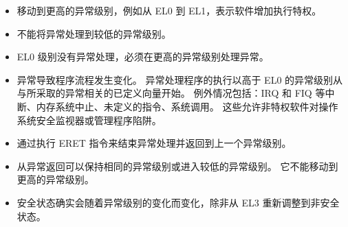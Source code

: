 \begin{itemize}
  \item 移动到更高的异常级别，例如从 EL0 到 EL1，表示软件增加执行特权。
  \item 不能将异常处理到较低的异常级别。
  \item EL0 级别没有异常处理，必须在更高的异常级别处理异常。
  \item 异常导致程序流程发生变化。
    异常处理程序的执行以高于 EL0 的异常级别从与所采取的异常相关的已定义向量开始。
    例外情况包括：IRQ 和 FIQ 等中断、内存系统中止、未定义的指令、系统调用。
    这些允许非特权软件对操作系统安全监视器或管理程序陷阱。
  \item 通过执行 ERET 指令来结束异常处理并返回到上一个异常级别。
  \item 从异常返回可以保持相同的异常级别或进入较低的异常级别。
    它不能移动到更高的异常级别。
  \item 安全状态确实会随着异常级别的变化而变化，除非从 EL3 重新调整到非安全状态。
\end{itemize}

